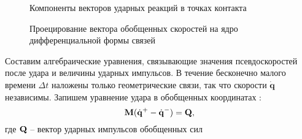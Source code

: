 
%

\begin{figure}[h]
        \centering
        \caption{Компоненты векторов ударных реакций в точках контакта}
        \label{fig:react}
    \endminipage
        \centering
        \caption{Проецирование вектора обобщенных скоростей на ядро дифференциальной формы связей}
        \label{fig:project}
    \endminipage
\end{figure}

Составим алгебраические уравнения, связывающие значения псевдоскоростей после удара и величины ударных импульсов. В течение бесконечно малого времени $\Delta t$ наложены только геометрические связи, так что скорости $\dot{\mathbf{q}}$ независимы. Запишем уравнение удара в обобщенных координатах \cite{Vilke}:
\begin{equation}\label{eq:udar_general}
\mathbf{M} (\dot{\mathbf{q}}^+ - \dot{\mathbf{q}}^-) = \mathbf{Q},
\end{equation}
где $\mathbf{Q}$ -- вектор ударных импульсов обобщенных сил

